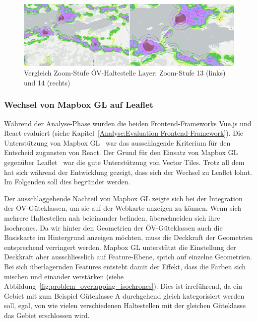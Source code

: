 \begin{figure}[ht]
    \centering
    \includegraphics[width=1.0\linewidth]{projectdoc/img/zoom-level-comparison.png}
    \caption[Vergleich Zoom-Stufe ÖV-Haltestelle Layer]{Vergleich Zoom-Stufe ÖV-Haltestelle Layer: Zoom-Stufe 13 (links) und 14 (rechts)}
    \label{fig:zoom-level-comparison}
\end{figure}


\subsubsection{Wechsel von Mapbox GL auf Leaflet}

Während der Analyse-Phase wurden die beiden Frontend-Frameworks Vue.js und React evaluiert (siehe Kapitel~\ref{Analyse:Evaluation Frontend-Framework}).
Die Unterstützung von Mapbox GL~\cite{mapbox_gl_js} war das ausschlagende Kriterium für den Entscheid zugunsten von React.
Der Grund für den Einsatz von Mapbox GL gegenüber Leaflet~\cite{leaflet} war die gute Unterstützung von Vector Tiles.
Trotz all dem hat sich während der Entwicklung gezeigt, dass sich der Wechsel zu Leaflet lohnt.
Im Folgenden soll dies begründet werden.

Der ausschlaggebende Nachteil von Mapbox GL zeigte sich bei der Integration der \acs{ÖV}-Güteklassen, um sie auf der Webkarte anzeigen zu können.
Wenn sich mehrere Haltestellen nah beieinander befinden, überschneiden sich ihre \glspl{Isochrone}.
Da wir hinter den Geometrien der \acs{ÖV}-Güteklassen auch die Basiskarte im Hintergrund anzeigen möchten, muss die Deckkraft der Geometrien entsprechend verringert werden.
Mapbox GL unterstützt die Einstellung der Deckkraft aber ausschliesslich auf Feature-Ebene, sprich auf einzelne Geometrien.
Bei sich überlagernden Features entsteht damit der Effekt, dass die Farben sich mischen und einander verstärken (siehe Abbildung~\ref{fig:problem_overlapping_isochrones}).
Dies ist irreführend, da ein Gebiet mit zum Beispiel Güteklasse A durchgehend gleich kategorisiert werden soll, egal, von wie vielen verschiedenen Haltestellen mit der gleichen Güteklasse das Gebiet erschlossen wird.

